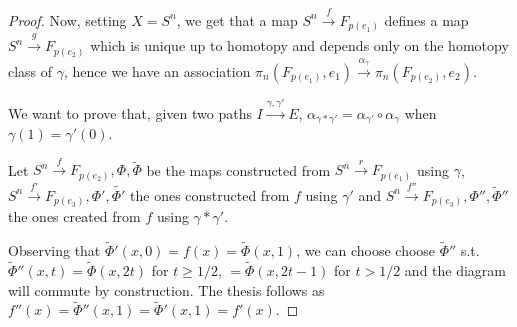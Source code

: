 \documentclass{article}
\begin{document}
\begin{proof}
    Now, setting $X=S^n$, we get that a map $S^n\xrightarrow{f}F_{p(e_1)}$
    defines a map $S^n\xrightarrow{g}F_{p(e_2)}$ which is unique up to homotopy
    and depends only on the homotopy class of $\gamma$, hence we have an
    association $\pi_n(F_{p(e_1)},e_1)\xrightarrow{\alpha_{\gamma}}
    \pi_n(F_{p(e_2)},e_2)$.

    We want to prove that, given two paths $I\xrightarrow{\gamma,\gamma'}E$,
    $\alpha_{\gamma*\gamma'}=\alpha_{\gamma'}\circ\alpha_{\gamma}$ when
    $\gamma(1)=\gamma'(0)$.

    Let $S^n\xrightarrow{f}F_{p(e_2)},\Phi,\tilde{\Phi}$ be the maps
    constructed from $S^n\xrightarrow{r}F_{p(e_1)}$ using $\gamma$,
    $S^n\xrightarrow{f'}F_{p(e_3)},\Phi',\tilde{\Phi'}$ the ones constructed
    from $f$ using $\gamma'$ and $S^n\xrightarrow{f''}F_{p(e_3)},\Phi'',
    \tilde{\Phi}''$ the ones created from $f$ using $\gamma*\gamma'$.

    Observing that $\tilde{\Phi}'(x,0)=f(x)=\tilde{\Phi}(x,1)$, we can choose
    choose $\tilde{\Phi}''$ s.t. $\tilde{\Phi}''(x,t)=\tilde{\Phi}(x,2t)$ for
    $t\geq1/2$, $=\tilde{\Phi}(x,2t-1)$ for $t>1/2$ and the diagram will commute
    by construction. The thesis follows as
    $f''(x)=\tilde{\Phi}''(x,1)=\tilde{\Phi}'(x,1)=f'(x)$.
\end{proof}
\end{document}
